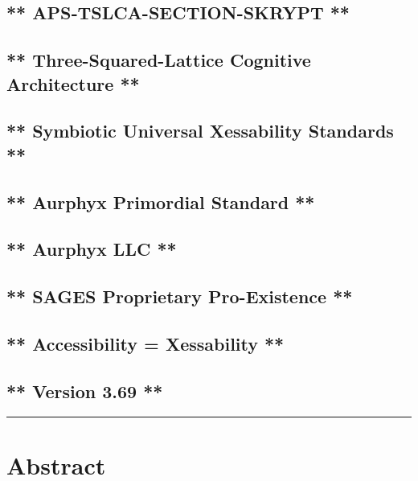 \subsection{** APS‑TSLCA-SECTION-SKRYPT **}\label{apstslca-section-skrypt}

\subsection{** Three-Squared-Lattice Cognitive Architecture **}\label{three-squared-lattice-cognitive-architecture}

\subsection{** Symbiotic Universal Xessability Standards **}\label{symbiotic-universal-xessability-standards}

\subsection{** Aurphyx Primordial Standard **}\label{aurphyx-primordial-standard}

\subsection{** Aurphyx LLC **}\label{aurphyx-llc}

\subsection{** SAGES \textbar{} Proprietary \textbar{} Pro-Existence **}\label{sages-proprietary-pro-existence}

\subsection{** Accessibility = Xessability **}\label{accessibility-xessability}

\subsection{** Version 3.69 **}\label{version-3.69}

\begin{center}\rule{0.5\linewidth}{0.5pt}\end{center}

\section{Abstract}\label{abstract}


